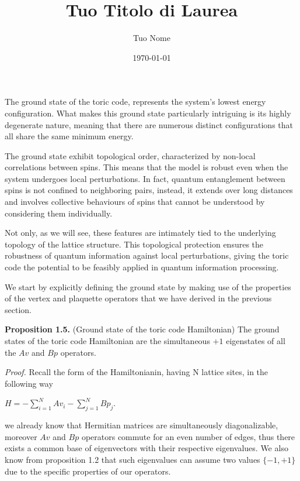 \documentclass[12pt]{report}
\title{Tuo Titolo di Laurea}
\author{Tuo Nome}
\date{\today} %
\begin{document}
	\begin{minipage}{1\textwidth}
		
	The ground state of the toric code, represents the system's lowest energy configuration. What makes this ground state particularly intriguing is its highly degenerate nature, meaning that there are numerous distinct configurations that all share the same minimum energy. 
	
	The ground state exhibit topological order, characterized by non-local correlations between spins. This means that the model is robust  even when the system undergoes local perturbations.  In fact, quantum entanglement between spins is not confined to neighboring pairs, instead, it extends over long distances and involves collective behaviours of spins that cannot be understood by considering them individually.
	
	Not only, as we will see, these features are intimately tied to the underlying topology of the lattice structure. This topological protection ensures the robustness of quantum information against local perturbations, giving the toric code the potential to be feasibly applied in quantum information processing.\newline
	
	We start by explicitly defining the ground state by making use of the properties of the vertex and plaquette operators that we have derived in the previous section.\newline
	
	\textbf{Proposition 1.5.} (Ground state of the toric code Hamiltonian) The ground states of the toric code Hamiltonian are the simultaneous $+1$ eigenstates of all the $Av$ and $Bp$ operators. \newline
	
	\textit{Proof.}\newline 
	Recall the form of the Hamiltonianin, having N lattice sites, in the following way \newline
	
	\begin{center}
		
		$H = -\sum_{i=1}^{N}
		Av_i - \sum_{j=1}^{N} Bp_j $.\newline
		
	\end{center}
	
	we already know that Hermitian matrices are simultaneously diagonalizable, moreover $Av$ and $Bp$ operators commute for an even number of edges, thus there exists a common base of eigenvectors with their respective eigenvalues. We also know from proposition 1.2 that such eigenvalues can assume two values $\{-1,+1\}$ due to the specific properties of our operators.\newline
	

\end{minipage}
\end{document}
